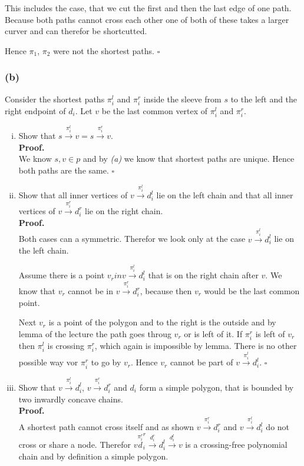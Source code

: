 \documentclass[11pt,a4paper,ngerman]{article}
\begin{document}
This includes the case, that we cut the first and then the last edge of one path. Because both paths cannot cross each other one
of both of these takes a larger curver and can therefor be shortcutted.

Hence $\pi_1$, $\pi_2$ were not the shortest paths.
\mbox{}\hfill$\square$

\subsubsection*{(b)}

Consider the shortest paths $\pi_i^l$ and $\pi_i^r$ inside the sleeve from $s$ to the left and the right endpoint
 of $d_i$. Let $v$ be the last common vertex of $\pi_i^l$ and $\pi_i^r$.

\begin{enumerate}[(i)]
    \item Show that $s \overset{\pi_i^l}{\rightarrow} v = s \overset{\pi_i^r}{\rightarrow} v$.\\
    \textbf{Proof.}\\
        We know $s, v \in p$ and by \emph{(a)} we know that shortest paths are unique.
        Hence both paths are the same.
        \mbox{} \hfill $\square$
    \item Show that all inner vertices of $v \overset{\pi_i^l}{\rightarrow} d_i^l$ lie on the left chain and
        that all inner vertices of $v \overset{\pi_i^r}{\rightarrow} d_i^r$ lie on the right chain.\\
    \textbf{Proof.}\\
        Both cases can a symmetric. Therefor we look only at the case $v \overset{\pi_i^l}{\rightarrow} d_i^l$ lie on the left chain.

        Assume there is a point $v_r in v \overset{\pi_i^l}{\rightarrow} d_i^l$ that is on the right chain after $v$.
        We know that $v_r$ cannot be in $v \overset{\pi_i^r}{\rightarrow} d_i^r$, because then $v_r$ would be the last common point.
        
        Next $v_r$ is a point of the polygon and to the right is the outside and by lemma of the lecture the
        path goes throug $v_r$ or is left of it.
        If $\pi_i^r$ is left of $v_r$ then $\pi_i^l$ is crossing $\pi_i^r$, which again is impossible by lemma.
        There is no other possible way vor $\pi_i^r$ to go by $v_r$. Hence $v_r$ cannot be part of $v \overset{\pi_i^l}{\rightarrow} d_i^l$.
        \mbox{} \hfill $\square$        
    \item Show that $v \overset{\pi_i^l}{\rightarrow} d_i^l$, $v \overset{\pi_i^r}{\rightarrow}d_i^r$ and $d_i$ form a simple polygon, that 
        is bounded by two inwardly concave chains.\\
    \textbf{Proof.}\\
        A shortest path cannot cross itself and as shown $v \overset{\pi_i^r}{\rightarrow} d_i^r$ and $v \overset{\pi_i^l}{\rightarrow} d_i^l$ 
        do not cross or share a node. Therefor
        $v \overset{\pi_i^r} d_i^r \overset{d_i^r}{\rightarrow} d_i^l \overset{d_i^l}{\rightarrow} v$ is a crossing-free polynomial chain
        and by definition a simple polygon.


\end{enumerate}
\end{document}
